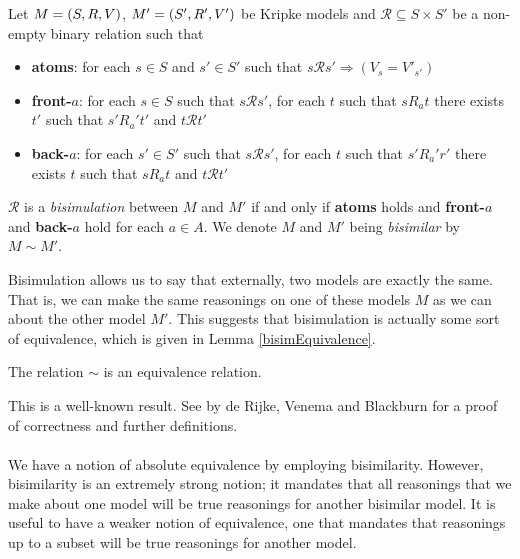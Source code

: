 \begin{defn} \label{bisimKripke}
	Let $M = (S,R,V)$, $M' = (S',R',V')$ be Kripke models and $\mathcal{R} \subseteq S \times S'$ be a non-empty binary
	relation such that
	\begin{itemize}
		\item {\bf atoms}: for each $s \in S$ and $s' \in S'$ such that $s \mathcal{R} s'\Rightarrow
			(V_s = V'_{s'})$
		\item {\bf front-$a$}: for each $s \in S$ such that $s \mathcal{R} s'$, for each $t$ such that
		$s R_a t$ there exists $t'$ such that $s' R_a' t'$ and $t \mathcal{R} t'$
		\item {\bf back-$a$}: for each $s' \in S'$ such that $s \mathcal{R} s'$, for each $t$ such that
		$s' R_a' r'$ there exists $t$ such that $s R_a t$ and $t \mathcal{R} t'$
	\end{itemize}
	$\mathcal{R}$ is a {\em bisimulation} between $M$ and $M'$ if and only if {\bf atoms} holds and {\bf front-$a$}
	and {\bf back-$a$} hold for each $a \in A$.
	We denote $M$ and $M'$ being {\em bisimilar} by $M \sim M'$.
\end{defn}

Bisimulation allows us to say that externally, two models are exactly the same.
That is, we can make the same reasonings on one of these models $M$ as we can about the other model
$M'$.
This suggests that bisimulation is actually some sort of equivalence, which is given in Lemma
\ref{bisimEquivalence}.

\begin{lemma} \label{bisimEquivalence}
	The relation $\sim$ is an equivalence relation.
\end{lemma}

This is a well-known result.
See \cite{blackburn2002modal} by de Rijke, Venema and Blackburn for a proof of correctness and
further definitions.\\
\\
We have a notion of absolute equivalence by employing bisimilarity.
However, bisimilarity is an extremely strong notion; it mandates that all reasonings that we make
about one model will be true reasonings for another bisimilar model.
It is useful to have a weaker notion of equivalence, one that mandates that reasonings up to a
subset will be true reasonings for another model.

